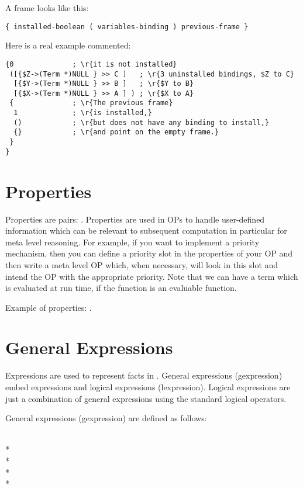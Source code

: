 A frame looks like this:
\begin{verbatim}
{ installed-boolean ( variables-binding ) previous-frame }
\end{verbatim}

Here is a real example commented:

\begin{verbatim}
{0              ; \r{it is not installed}
 ([{$Z->(Term *)NULL } >> C ]   ; \r{3 uninstalled bindings, $Z to C}
  [{$Y->(Term *)NULL } >> B ]   ; \r{$Y to B}
  [{$X->(Term *)NULL } >> A ] ) ; \r{$X to A}
 {              ; \r{The previous frame}
  1             ; \r{is installed,}
  ()            ; \r{but does not have any binding to install,}
  {}            ; \r{and point on the empty frame.}
 }
}
\end{verbatim}

\section{Properties}

Properties are pairs: . Properties are used in OPs to handle
user-defined information which can be relevant to subsequent computation in
particular for meta level reasoning. For example, if you want to implement a
priority mechanism, then you can define a priority slot in the properties of
your OP and then write a meta level OP which, when necessary, will look in this
slot and intend the OP with the appropriate priority.  Note that we can have a
term which is evaluated at run time, if the function is an evaluable
function.

Example of properties: .

\section{General Expressions}

Expressions are used to represent facts in \COPRS{}.  General expressions
(gexpression) embed expressions and logical expressions (lexpression). Logical
expressions are just a combination of general expressions using the standard
logical operators.

General expressions (gexpression) are defined as follows:

\noindent
{} \\*
 \\*
 \\*
 \\*

